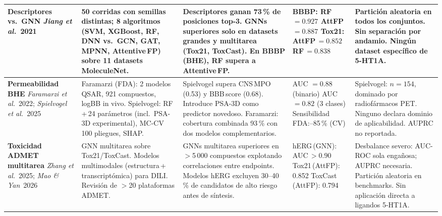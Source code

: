 \begin{landscape}
\begin{table}[h!]
\begin{tabular}{
  P{2.4cm}
  P{4.2cm}
  P{5.0cm}
  P{3.2cm}
  P{4.6cm}
}
\midrule

\textbf{Descriptores vs.\ GNN}\newline
\emph{Jiang et al.}\ 2021 &
50 corridas con semillas distintas; 8 algoritmos (SVM, XGBoost, RF,
DNN vs.\ GCN, GAT, MPNN, Attentive\,FP) sobre 11 datasets
MoleculeNet. &
Descriptores ganan 73\,\% de posiciones top-3. GNNs superiores
solo en datasets grandes y multitarea (Tox21, ToxCast). En BBBP
(BHE), RF supera a Attentive\,FP. &
BBBP: RF\,$=0.927$\newline
\phantom{BBBP: }AttFP\,$=0.887$\newline
Tox21: AttFP\,$=0.852$\newline
\phantom{Tox21: }RF\,$=0.838$ &
Partición aleatoria en todos los conjuntos. Sin separación por
andamio. Ningún dataset específico de 5-HT1A. \\

\midrule

\textbf{Permeabilidad BHE}\newline
\emph{Faramarzi et al.}\ 2022;\newline
\emph{Spielvogel et al.}\ 2025 &
Faramarzi (FDA): 2 modelos QSAR, 921 compuestos, logBB in
vivo.\newline
Spielvogel: RF\,+\,24 parámetros (incl.\ PSA-3D experimental),
MC-CV 100 pliegues, SHAP. &
Spielvogel supera CNS\,MPO (0.53) y BBB\,score (0.68). Introduce
PSA-3D como predictor novedoso. Faramarzi: cobertura combinada
93\,\% con dos modelos complementarios. &
AUC $=0.88$ (binario)\newline
AUC $=0.82$ (3 clases)\newline
Sensibilidad FDA:--85\,\% (CV) &
Spielvogel: $n=154$, dominado por radiofármacos PET. Ninguno
declara dominio de aplicabilidad. AUPRC no reportada. \\

\midrule

\textbf{Toxicidad ADMET multitarea}\newline
\emph{Zhang et al.}\ 2025;\newline
\emph{Mao \& Yan}\ 2026 &
GNN multitarea sobre Tox21/ToxCast. Modelos multimodales
(estructura\,+\,transcriptómica) para DILI. Revisión de $>$20
plataformas ADMET. &
GNNs multitarea superiores en $>$5\,000 compuestos explotando
correlaciones entre endpoints. Modelos hERG excluyen 30--40\,\% de
candidatos de alto riesgo antes de síntesis. &
hERG\,(GNN): AUC\,$>0.90$\newline
Tox21\,(AttFP): 0.852\newline
ToxCast\,(AttFP): 0.794 &
Desbalance severo: AUC-ROC sola engañosa; AUPRC necesaria.
Partición aleatoria en benchmarks. Sin aplicación directa a
ligandos 5-HT1A. \\


\end{tabular}
\end{table}
\end{landscape}
